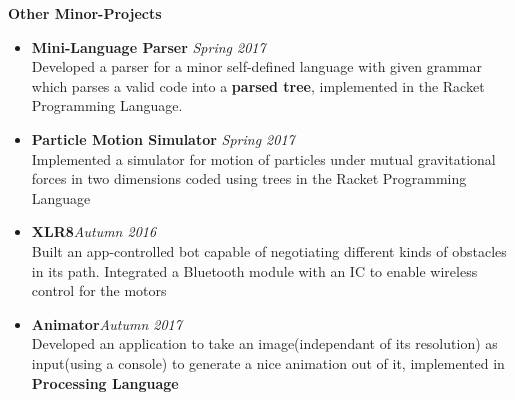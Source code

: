 \documentclass[10pt,a4paper]{article}
\newcommand{\xfilll}[2][1ex]{
\dimen0=#2\advance\dimen0 by #1
\leaders\hrule height \dimen0 depth -#1\hfill}
\begin{document}
\vspace{-6pt}
\textbf {Other Minor-Projects}\\
\vspace{-19pt}
\begin{itemize}[itemsep = -0.75 mm, leftmargin=*]
\item \textbf{Mini-Language Parser} \hfill{\sl \small Spring 2017}\\
Developed a parser for a minor self-defined language with given grammar which parses a valid code into
a \textbf{parsed tree}, implemented in the Racket Programming Language.
\item \textbf{Particle Motion Simulator} \hfill{\sl \small Spring 2017}\\
Implemented a simulator for motion of particles under mutual gravitational forces in two dimensions
coded using trees in the Racket Programming Language
\item \textbf{XLR8}\hfill{\sl \small Autumn 2016}\\
Built an app-controlled bot capable of negotiating different kinds of obstacles in its path. Integrated a Bluetooth module with an IC to enable wireless control for the motors
\item \textbf{Animator}\hfill{\sl \small Autumn 2017}\\
Developed an application to take an image(independant of its resolution) as input(using a console) to generate a nice animation out of it, implemented in \textbf{Processing Language} 
\end{itemize}
\vspace{-10pt}

\vspace{-12pt}
\end{document}
